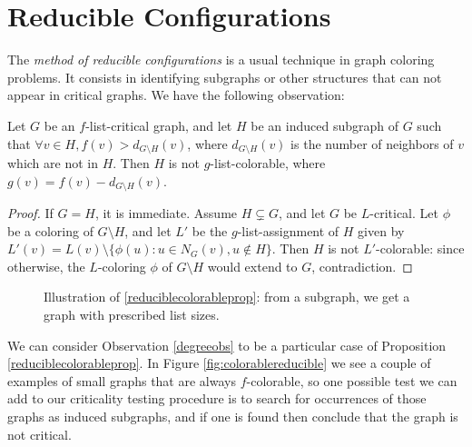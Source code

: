 \section{Reducible Configurations}

The \emph{method of reducible configurations} is a usual technique in graph coloring problems. It consists in identifying subgraphs 
or other structures that can not appear in critical graphs. We have the following observation:

\begin{proposition}
\label{reduciblecolorableprop}
Let $G$ be an $f$-list-critical graph, and let $H$ be an induced subgraph of $G$ such that $\forall v \in H, f(v) > d_{G\setminus H}(v)$,
where $d_{G \setminus H}(v)$ is the number of neighbors of $v$ which are not in $H$. Then $H$ is not $g$-list-colorable, where $g(v) = f(v) -d_{G\setminus H}(v)$.
\end{proposition}

\begin{proof}
If $G = H$, it is immediate. Assume $H \subsetneq G$, and let $G$ be $L$-critical. 
Let $\phi$ be a coloring of $G \setminus H$, and let $L'$ be the $g$-list-assignment of $H$ given by 
$L'(v) = L(v) \setminus \{\phi(u) : u \in N_G(v), u \not\in H\}$. 
Then $H$ is not $L'$-colorable: since otherwise, the $L$-coloring $\phi$ of $G \setminus H$ would extend to $G$, contradiction.
\end{proof}

\begin{figure}
\centering
\begin{tikzpicture}[scale=0.8]

\end{tikzpicture}
\begin{tikzpicture}[scale=0.8]

\end{tikzpicture}
\caption{Illustration of \ref{reduciblecolorableprop}: from a subgraph, we get a graph with prescribed list sizes.}
\end{figure}

We can consider Observation \ref{degreeobs} to be a particular case of Proposition \ref{reduciblecolorableprop}. 
In Figure \ref{fig:colorablereducible} we see a couple of examples of small graphs that are always $f$-colorable,
so one possible test we can add to our criticality testing procedure is to search for occurrences of those graphs as induced subgraphs,
and if one is found then conclude that the graph is not critical.



